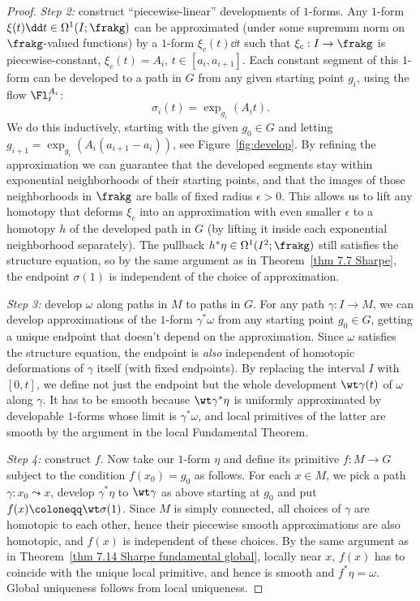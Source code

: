\begin{proof}
    \emph{Step 2:} construct ``piecewise-linear'' developments of $1$-forms. Any $1$-form $\xi(t)\dd t\in\Omega^1(I;\frakg)$ can be approximated (under some supremum norm on $\frakg$-valued functions) by a $1$-form $\xi_c(t)\dd t$ such that $\xi_c:I\to \frakg$ is piecewise-constant, $\xi_c(t)=A_i$, $t\in[a_i,a_{i+1}]$. Each constant segment of this $1$-form can be developed to a path in $G$ from any given starting point $g_i$, using the flow $\Fl^{A_i}_t$:
    \[\sigma_i(t)=\exp_{g_i}(A_i t).\]
    We do this inductively, starting with the given $g_0\in G$ and letting $g_{i+1}=\exp_{g_i}(A_i (a_{i+1}-a_i))$, see Figure~\ref{fig:develop}. By refining the approximation we can guarantee that the developed segments stay within exponential neighborhoods of their starting points, and that the images of those neighborhoods in $\frakg$ are balls of fixed radius $\epsilon>0$. This allows us to lift any homotopy that deforms $\xi_c$ into an approximation with even smaller $\epsilon$ to a homotopy $h$ of the developed path in $G$ (by lifting it inside each exponential neighborhood separately). The pullback $h^\ast \eta\in \Omega^1(I^2;\frakg)$ still satisfies the structure equation, so by the same argument as in Theorem~\ref{thm 7.7 Sharpe}, the endpoint $\sigma(1)$ is independent of the choice of approximation.

    \emph{Step 3:} develop $\omega$ along paths in $M$ to paths in $G$. For any path $\gamma:I\to M$, we can develop approximations of the $1$-form $\gamma^\ast \omega$ from any starting point $g_0\in G$, getting a unique endpoint that doesn't depend on the approximation. Since $\omega$ satisfies the structure equation, the endpoint is \emph{also} independent of homotopic deformations of $\gamma$ itself (with fixed endpoints). By replacing the interval $I$ with $[0,t]$, we define not just the endpoint but the whole development $\wt\gamma(t)$ of $\omega$ along $\gamma$. It has to be smooth because $\wt\gamma^\ast \eta$ is uniformly approximated by developable $1$-forms whose limit is $\gamma^\ast\omega$, and local primitives of the latter are smooth by the argument in the local Fundamental Theorem.

    \emph{Step 4:} construct $f$. Now take our $1$-form $\eta$ and define its primitive $f:M\to G$ subject to the condition $f(x_0)=g_0$ as follows. For each $x\in M$, we pick a path $\gamma:x_0\leadsto x$, develop $\gamma^\ast\eta$ to $\wt\gamma$ as above starting at $g_0$ and put $f(x)\coloneqq \wt\sigma(1)$. Since $M$ is simply connected, all choices of $\gamma$ are homotopic to each other, hence their piecewise smooth approximations are also homotopic, and $f(x)$ is independent of these choices. By the same argument as in Theorem~\ref{thm 7.14 Sharpe fundamental global}, locally near $x$, $f(x)$ has to coincide with the unique local primitive, and hence is smooth and $f^\ast\eta=\omega$. Global uniqueness follows from local uniqueness.
\end{proof}

